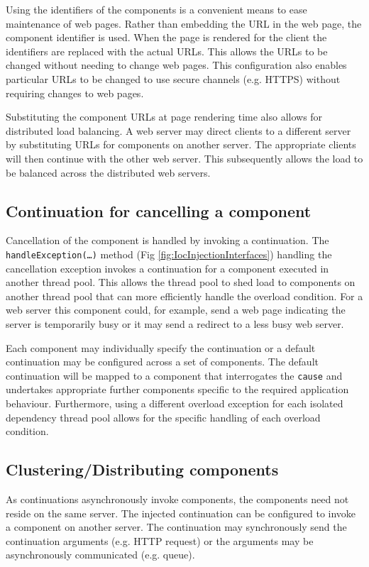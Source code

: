 \documentclass[prodmode]{style/acmlarge}
\begin{document}
Using the identifiers of the components is a convenient means to ease
maintenance of web pages.  Rather than embedding the URL in the web page, the
component identifier is used.  When the page is rendered for the client the
identifiers are replaced with the actual URLs.  This allows the URLs to be
changed without needing to change web pages.  This configuration also enables
particular URLs to be changed to use secure channels (e.g. HTTPS) without
requiring changes to web pages.

Substituting the component URLs at page rendering time also allows for
distributed load balancing.  A web server may direct clients to a different
server by substituting URLs for components on another server. The appropriate
clients will then continue with the other web server.  This subsequently allows the
load to be balanced across the distributed web servers.


\subsection{Continuation for cancelling a component}

Cancellation of the component is handled by invoking a continuation.  The
\texttt{handle\-Exception(\ldots)} method (Fig \ref{fig:IocInjectionInterfaces})
handling the cancellation exception invokes a continuation for a component
executed in another thread pool.  This allows the thread pool to shed load to
components on another thread pool that can more efficiently handle the overload
condition.  For a web server this component could, for example, send a web page
indicating the server is temporarily busy or it may send a redirect to a less
busy web server.

Each component may individually specify the continuation or a default
continuation may be configured across a set of components.
The default continuation will be mapped to a component that interrogates the
\texttt{cause} and undertakes appropriate further components specific to the
required application behaviour.  Furthermore, using a different overload
exception for each isolated dependency thread pool allows for the specific
handling of each overload condition.


\subsection{Clustering/Distributing components}

As continuations asynchronously invoke components, the components need not
reside on the same server.  The injected continuation can be configured to
invoke a component on another server.  The continuation may synchronously send
the continuation arguments (e.g. HTTP request) or the arguments may be
asynchronously communicated (e.g. queue).
\end{document}
